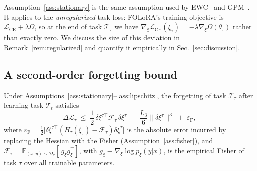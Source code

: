 Assumption~\ref{ass:stationary} is the same assumption used by
EWC~\cite{kirkpatrick2017overcoming} and GPM~\cite{saha2021gradient}. It applies to the
\emph{unregularized} task loss: FOLoRA's training objective is
$\mathcal{L}_{\text{CE}}+\lambda\Omega$, so at the end of task $\mathcal{T}_\tau$ we have
$\nabla_\xi\mathcal{L}_{\text{CE}}(\xi_\tau)=-\lambda\nabla_\xi\Omega(\theta_\tau)$ rather
than exactly zero. We discuss the size of this deviation in
Remark~\ref{rem:regularized} and quantify it empirically in
Sec.~\ref{sec:discussion}.

\subsection{A second-order forgetting bound}
\label{sec:bound}

\begin{theorem}
\label{thm:forgetting}
Under Assumptions~\ref{ass:stationary}--\ref{ass:lipschitz}, the forgetting of task
$\mathcal{T}_\tau$ after learning task $\mathcal{T}_t$ satisfies
\begin{equation}
\Delta\mathcal{L}_\tau
\;\le\;
\frac12\,\delta\xi^{\tau\top} \mathcal{F}_\tau\,\delta\xi^{\tau}
\;+\;\frac{L_3}{6}\big\|\delta\xi^{\tau}\big\|^{3}
\;+\;\varepsilon_{\mathrm{F}},
\label{eq:bound1}
\end{equation}
where
$\varepsilon_{\mathrm{F}}=\tfrac12\big|\delta\xi^{\tau\top}(H_\tau(\xi_\tau)-\mathcal{F}_\tau)\delta\xi^{\tau}\big|$
is the absolute error incurred by replacing the Hessian with the Fisher
(Assumption~\ref{ass:fisher}), and
$\mathcal{F}_\tau=\mathbb{E}_{(x,y)\sim\mathcal{D}_\tau}[\,g_\xi g_\xi^{\!\top}]$,
with $g_\xi\equiv\nabla_\xi\log p_\xi(y|x)$, is the empirical Fisher of task $\tau$
over all trainable parameters.
\end{theorem}

